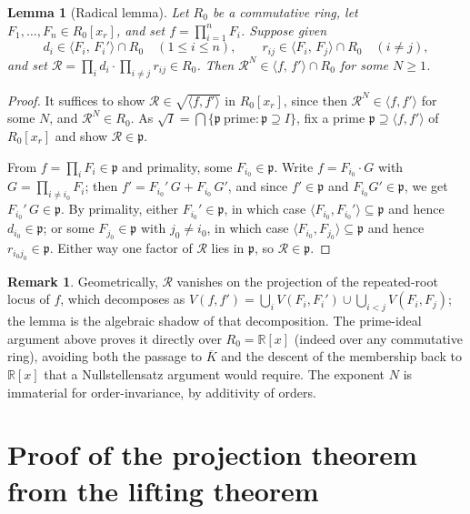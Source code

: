 \documentclass[11pt,a4paper]{article}
\theoremstyle{plain}
\newtheorem{lemma}[theorem]{Lemma}
\theoremstyle{definition}
\newtheorem{remark}[theorem]{Remark}
\newcommand{\R}{\mathbb{R}}
\newcommand{\ideal}[1]{\langle #1\rangle}
\begin{document}
\begin{lemma}[Radical lemma]\label{lem:radical}
Let $R_0$ be a commutative ring, let $F_1,\dots,F_n\in R_0[x_r]$, and set
$f=\prod_{i=1}^n F_i$. Suppose given
\[
  d_i\in\ideal{F_i,\,F_i'}\cap R_0\quad(1\le i\le n),\qquad
  r_{ij}\in\ideal{F_i,\,F_j}\cap R_0\quad(i\neq j),
\]
and set $\mathcal R=\prod_i d_i\cdot\prod_{i\neq j} r_{ij}\in R_0$. Then
$\mathcal R^{N}\in\ideal{f,\,f'}\cap R_0$ for some $N\ge 1$.
\end{lemma}

\begin{proof}
It suffices to show $\mathcal R\in\sqrt{\ideal{f,f'}}$ in $R_0[x_r]$, since
then $\mathcal R^N\in\ideal{f,f'}$ for some $N$, and $\mathcal R^N\in R_0$.
As $\sqrt{I}=\bigcap\{\mathfrak p\ \text{prime}:\mathfrak p\supseteq I\}$, fix
a prime $\mathfrak p\supseteq\ideal{f,f'}$ of $R_0[x_r]$ and show
$\mathcal R\in\mathfrak p$.

From $f=\prod_i F_i\in\mathfrak p$ and primality, some $F_{i_0}\in\mathfrak p$.
Write $f=F_{i_0}\cdot G$ with $G=\prod_{i\neq i_0}F_i$; then
$f'=F_{i_0}'\,G+F_{i_0}\,G'$, and since $f'\in\mathfrak p$ and
$F_{i_0}G'\in\mathfrak p$, we get $F_{i_0}'\,G\in\mathfrak p$. By primality,
either $F_{i_0}'\in\mathfrak p$, in which case
$\ideal{F_{i_0},F_{i_0}'}\subseteq\mathfrak p$ and hence
$d_{i_0}\in\mathfrak p$; or some $F_{j_0}\in\mathfrak p$ with $j_0\neq i_0$,
in which case $\ideal{F_{i_0},F_{j_0}}\subseteq\mathfrak p$ and hence
$r_{i_0 j_0}\in\mathfrak p$. Either way one factor of $\mathcal R$ lies in
$\mathfrak p$, so $\mathcal R\in\mathfrak p$.
\end{proof}

\begin{remark}
Geometrically, $\mathcal R$ vanishes on the projection of the repeated-root
locus of $f$, which decomposes as
$V(f,f')=\bigcup_iV(F_i,F_i')\cup\bigcup_{i<j}V(F_i,F_j)$; the lemma is the
algebraic shadow of that decomposition. The prime-ideal argument above proves
it directly over $R_0=\R[x]$ (indeed over any commutative ring), avoiding both
the passage to $\overline{K}$ and the descent of the membership back to
$\R[x]$ that a Nullstellensatz argument would require. The exponent $N$ is
immaterial for order-invariance, by additivity of orders.
\end{remark}

\section{Proof of the projection theorem from the lifting theorem}
\label{sec:proj-proof}
\end{document}
